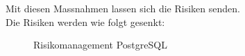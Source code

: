 \begin{flushleft}
    Mit diesen Massnahmen lassen sich die Risiken senden.\\
    Die Risiken werden wie folgt gesenkt:
    \begin{figure}[H]
        \centering
        \qquad
        \caption{Risikomanagement PostgreSQL}
        \label{fig:riskmanagement_postgresql}
    \end{figure}
\end{flushleft}